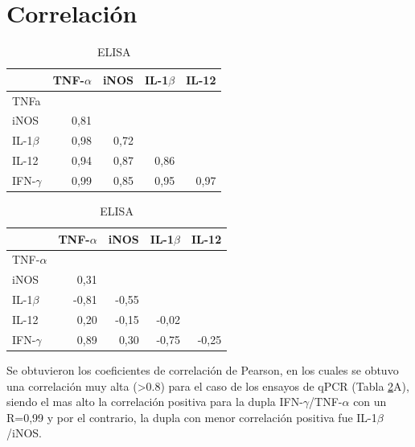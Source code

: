 \documentclass[12pt,letterpaper,oneside]{scrbook}
\begin{document}
\clearpage

\section{Correlación}

\begin{table}[h!]
\centering
\caption[Matrices de correlación de las moléculas en estudio]{Matrices de correlación de las moléculas en estudio, para qPCR y ELISA}\label{tab:corr}
\begin{subtable}{.5\textwidth}
\centering

\begin{tabular}{lrrrr}
\toprule
   & TNF-$\alpha$ & iNOS & IL-1$\beta$ & IL-12 \\ 
  \midrule
TNFa &  &  &  &  \\ 
  iNOS &  {\color{OliveGreen}0,81}  &  &  &  \\ 
  IL-1$\beta$ &  {\color{OliveGreen}0,98}  &  0,72  &  &  \\ 
  IL-12 &  {\color{OliveGreen}0,94}  &  {\color{OliveGreen}0,87}  &  {\color{OliveGreen}0,86}  &  \\ 
  IFN-$\gamma$ &  {\color{OliveGreen}0,99} &  {\color{OliveGreen}0,85}  &  {\color{OliveGreen}0,95}  &  {\color{OliveGreen}0,97}  \\ 
   \bottomrule
   \end{tabular}

\caption{qPCR}
\end{subtable}%
\begin{subtable}{.5\textwidth}
\centering

\begin{tabular}{lrrrr}
\toprule
        & TNF-$\alpha$ & iNOS & IL-1$\beta$ & IL-12 \\ 
  \midrule
  TNF-$\alpha$ & & & & \\
  iNOS &  0,31  &  &  &  \\ 
  IL-1$\beta$ & {\color{red}-0,81}  & -0,55  &  &  \\ 
  IL-12 &  0,20  & -0,15  & -0,02  &  \\ 
  IFN-$\gamma$ &  {\color{OliveGreen}0,89}  &  0,30  & -0,75  & -0,25  \\ 
   \bottomrule
   \end{tabular}

\caption{ELISA}
\end{subtable}
\end{table}

Se obtuvieron los coeficientes de correlación de Pearson, en los cuales
se obtuvo una correlación muy alta (\textgreater{}0.8) para el caso de
los ensayos de qPCR (Tabla \ref{tab:corr}A), siendo el mas alto la
correlación positiva para la dupla IFN-\(\gamma\)/TNF-\(\alpha\) con un
R=0,99 y por el contrario, la dupla con menor correlación positiva fue
IL-1\(\beta\)/iNOS.
\end{document}
